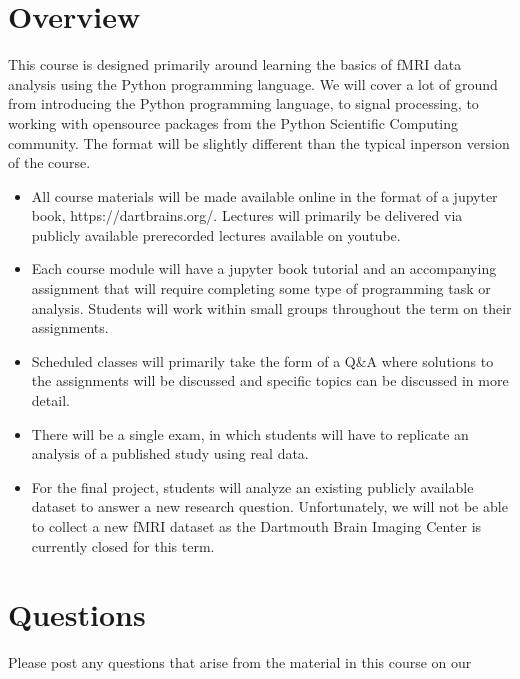 \documentclass[letterpaper,10pt,english]{sphinxmanual}
\begin{document}
\chapter{Overview}
\label{\detokenize{content/intro:overview}}
This course is designed primarily around learning the basics of fMRI data analysis using the Python programming language. We will cover a lot of ground from introducing the Python programming language, to signal processing, to working with opensource packages from the Python Scientific Computing community. The format will be slightly different than the typical in\sphinxhyphen{}person version of the course.
\begin{itemize}
\item {} 
All course materials will be made available online in the format of a jupyter book, https://dartbrains.org/. Lectures will primarily be delivered via publicly available pre\sphinxhyphen{}recorded lectures available on youtube.

\item {} 
Each course module will have a jupyter book tutorial and an accompanying assignment that will require completing some type of programming task or analysis. Students will work within small groups throughout the term on their assignments.

\item {} 
Scheduled classes will primarily take the form of a Q\&A where solutions to the assignments will be discussed and specific topics can be discussed in more detail.

\item {} 
There will be a single exam, in which students will have to replicate an analysis of a published study using real data.

\item {} 
For the final project, students will analyze an existing publicly available dataset to answer a new research question. Unfortunately, we will not be able to collect a new fMRI dataset as the Dartmouth Brain Imaging Center is currently closed for this term.

\end{itemize}


\chapter{Questions}
\label{\detokenize{content/intro:questions}}
Please post any questions that arise from the material in this course on our 
\end{document}
